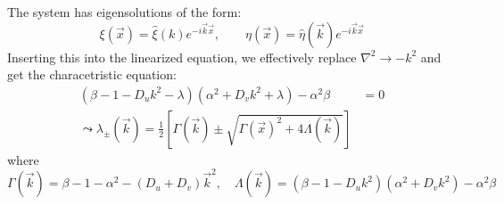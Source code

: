 The system has eigensolutions of the form:
\begin{equation*}
	\xi(\vec{x})=\hat{\xi}(k)e^{-i\vec{k}\vec{x}},\qquad \eta(\vec{x})=\hat{\eta}(\vec{k})e^{-i\vec{k}\vec{x}}
\end{equation*}
Inserting this into the linearized equation, we effectively replace $\nabla^2\to -k^2$ and get the characetristic equation:
\begin{align*}
	\left(\beta-1 -D_uk^2 -\lambda\right)\left(\alpha^2+D_vk^2+\lambda\right) -\alpha^2\beta&=0\\
	\leadsto \lambda_\pm(\vec{k})=\frac{1}{2}\left[\Gamma(\vec{k})\pm\sqrt{\Gamma(\vec{x})^2+4\Lambda(\vec{k})}\right]
\end{align*}
where
\begin{equation*}
	\Gamma(\vec{k})=\beta -1 -\alpha^2 -(D_u+D_v)\vec{k}^2,\quad \Lambda(\vec{k})=(\beta -1 -D_uk^2)(\alpha^2 + D_vk^2)-\alpha^2\beta
\end{equation*}

